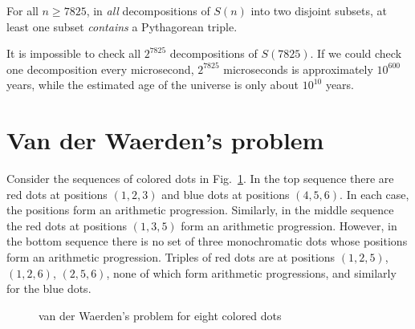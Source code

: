 \begin{theorem}
For all $n\geq 7825$, in \emph{all} decompositions of $S(n)$ into two disjoint subsets, at least one subset \emph{contains} a Pythagorean triple.
\end{theorem}
It is impossible to check all $2^{7825}$ decompositions of $S(7825)$. If we could check one decomposition every microsecond, $2^{7825}$ microseconds is approximately $10^{600}$ years, while the estimated age of the universe is only about $10^{10}$ years.




\section{Van der Waerden's problem}\label{s.van}

Consider the sequences of colored dots in Fig.~\ref{f.vdw1}. In the top sequence there are red dots at positions $(1,2,3)$ and blue dots at positions $(4,5,6)$. In each case, the positions form an arithmetic progression. Similarly, in the middle sequence the red dots at positions $(1,3,5)$ form an arithmetic progression. However, in the bottom sequence there is no set of three monochromatic dots whose positions form an arithmetic progression. 
Triples of red dots are at positions $(1,2,5)$, $(1,2,6)$, $(2,5,6)$, none of which form arithmetic progressions, and similarly for the blue dots.

\begin{figure}[htb]
\begin{center}
\end{center}
\caption{van der Waerden's problem for eight colored dots}\label{f.vdw1}
\end{figure}

